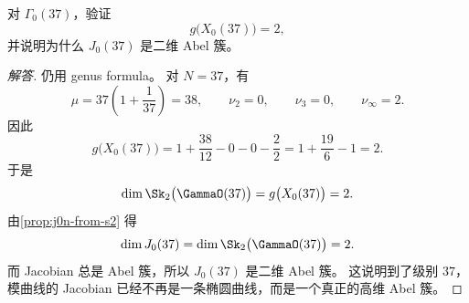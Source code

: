 \begin{exercise}
\label{ex:jacobian-x037}
对 $\Gamma_0(37)$，验证
\[
  g\bigl(X_0(37)\bigr)=2,
\]
并说明为什么 $J_0(37)$ 是二维 Abel 簇。
\end{exercise}

\begin{proof}[解答]
仍用 genus formula。
对 $N=37$，有
\[
  \mu=37\left(1+\frac1{37}\right)=38,
  \qquad
  \nu_2=0,
  \qquad
  \nu_3=0,
  \qquad
  \nu_\infty=2.
\]
因此
\[
  g\bigl(X_0(37)\bigr)=1+\frac{38}{12}-0-0-\frac22=1+\frac{19}{6}-1=2.
\]
于是
\[
  \dim \Sk_2\bigl(\GammaO(37)\bigr)=g\bigl(X_0(37)\bigr)=2.
\]
由\cref{prop:j0n-from-s2} 得
\[
  \dim J_0(37)=\dim \Sk_2\bigl(\GammaO(37)\bigr)=2.
\]
而 Jacobian 总是 Abel 簇，所以 $J_0(37)$ 是二维 Abel 簇。
这说明到了级别 $37$，模曲线的 Jacobian 已经不再是一条椭圆曲线，而是一个真正的高维 Abel 簇。
\end{proof}
